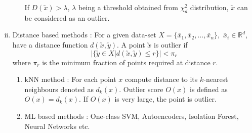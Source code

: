 \documentclass[11pt, a4paper]{article}
\begin{document}
\begin{enumerate}[(i)]
\begin{enumerate}[(a)]
If $D(\utilde{x}) > \lambda$, $\lambda$ being a threshold obtained from $\chi_{d}^2$ distribution, $\utilde{x}$ can be considered as an outlier.
\end{enumerate}

\item Distance based methods : For a given data-set $X = \{ \utilde{x_1}, \utilde{x_2}, \ldots, \utilde{x_n} \}, \,\, \utilde{x_i} \in \mathbb{R}^d$, have a distance function $d(\utilde{x}, \utilde{y})$. A point $\utilde{x}$ is outlier if $$\left|\{\utilde{y} \in X | d(\utilde{x}, \utilde{y}) \leq r\}\right| < \pi_{r}$$
where $\pi_{r}$ is the minimum fraction of points required at distance $r$.
\begin{enumerate}
\item kNN method : For each point $x$ compute distance to its $k$-nearest neighbours denoted as $d_k(x)$. Outlier score $O(x)$ is defined as $O(x) = d_k(x)$. If $O(x)$ is very large, the point is outlier.
\item ML based methods : One-class SVM, Autoencoders, Isolation Forest, Neural Networks etc.
\end{enumerate}
\end{enumerate}
\end{document}
